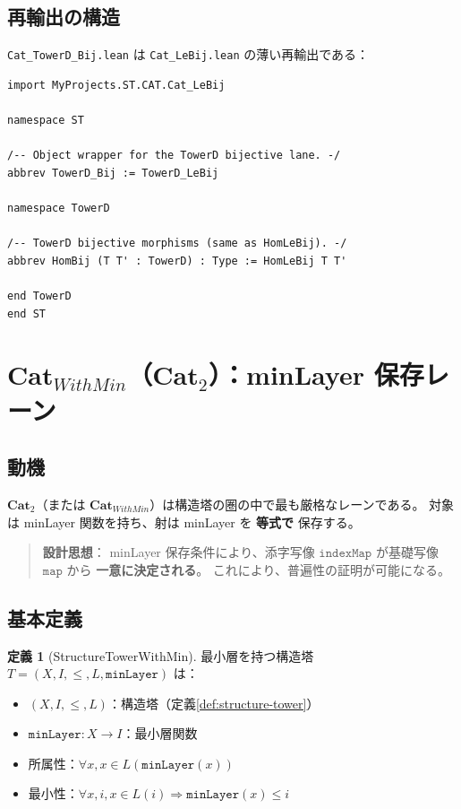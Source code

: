 \documentclass{ltjsarticle}
\theoremstyle{definition}
\newtheorem{definition}{定義}[section]
\newcommand{\cattwo}{\mathbf{Cat}_2}
\newcommand{\catWithMin}{\mathbf{Cat}_{WithMin}}
\newcommand{\minLayer}{\mathtt{minLayer}}
\newcommand{\indexMap}{\mathtt{indexMap}}
\begin{document}
\subsection{再輸出の構造}

\texttt{Cat\_TowerD\_Bij.lean} は \texttt{Cat\_LeBij.lean} の薄い再輸出である：

\begin{lstlisting}[caption=Cat\_TowerD\_Bij.lean の内容]
import MyProjects.ST.CAT.Cat_LeBij

namespace ST

/-- Object wrapper for the TowerD bijective lane. -/
abbrev TowerD_Bij := TowerD_LeBij

namespace TowerD

/-- TowerD bijective morphisms (same as HomLeBij). -/
abbrev HomBij (T T' : TowerD) : Type := HomLeBij T T'

end TowerD
end ST
\end{lstlisting}

\section{$\catWithMin$（$\cattwo$）：minLayer 保存レーン}

\subsection{動機}

$\cattwo$（または $\catWithMin$）は構造塔の圏の中で最も厳格なレーンである。
対象は minLayer 関数を持ち、射は minLayer を \textbf{等式で} 保存する。

\begin{quote}
\textbf{設計思想}：
minLayer 保存条件により、添字写像 $\indexMap$ が基礎写像 $\mathtt{map}$ から
\textbf{一意に決定される}。
これにより、普遍性の証明が可能になる。
\end{quote}

\subsection{基本定義}

\begin{definition}[StructureTowerWithMin]
\label{def:structure-tower-with-min}
最小層を持つ構造塔 $T = (X, I, \leq, L, \minLayer)$ は：
\begin{itemize}
  \item $(X, I, \leq, L)$：構造塔（定義\ref{def:structure-tower}）
  \item $\minLayer : X \to I$：最小層関数
  \item 所属性：$\forall x, x \in L(\minLayer(x))$
  \item 最小性：$\forall x, i, x \in L(i) \Rightarrow \minLayer(x) \leq i$
\end{itemize}
\end{definition}
\end{document}

